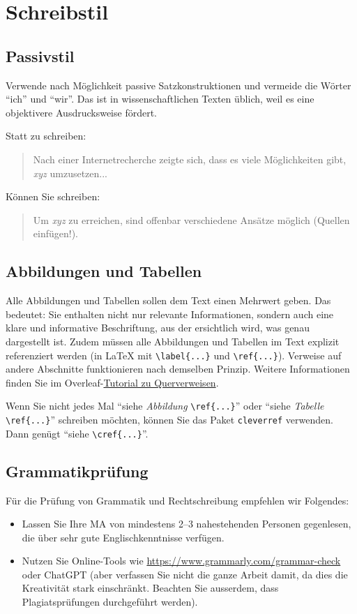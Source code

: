 \section{Schreibstil}
\subsection{Passivstil}
Verwende nach Möglichkeit passive Satzkonstruktionen und vermeide die Wörter \enquote{ich} und \enquote{wir}. Das ist in wissenschaftlichen Texten üblich, weil es eine objektivere Ausdrucksweise fördert.

\begin{tcolorbox}[title=Beispiel]
	Statt zu schreiben:
	\begin{quotation}
		Nach einer Internetrecherche zeigte sich, dass es viele Möglichkeiten gibt, \textit{xyz} umzusetzen...
	\end{quotation}
	Können Sie schreiben:
	\begin{quotation}
		Um \textit{xyz} zu erreichen, sind offenbar verschiedene Ansätze möglich (Quellen einfügen!).
	\end{quotation}
\end{tcolorbox}

\subsection{Abbildungen und Tabellen}
Alle Abbildungen und Tabellen sollen dem Text einen Mehrwert geben. Das bedeutet: Sie enthalten nicht nur relevante Informationen, sondern auch eine klare und informative Beschriftung, aus der ersichtlich wird, was genau dargestellt ist. Zudem müssen alle Abbildungen und Tabellen im Text explizit referenziert werden (in \LaTeX{} mit \lstinline|\label{...}| und \lstinline|\ref{...}|). Verweise auf andere Abschnitte funktionieren nach demselben Prinzip. Weitere Informationen finden Sie im Overleaf-\href{https://www.overleaf.com/learn/latex/Cross_referencing_sections%2C_equations_and_floats}{Tutorial zu Querverweisen}.

Wenn Sie nicht jedes Mal ``siehe \textit{Abbildung} \lstinline|\ref{...}|'' oder ``siehe \textit{Tabelle} \lstinline|\ref{...}|'' schreiben möchten, können Sie das Paket \texttt{cleverref} verwenden. Dann genügt ``siehe \lstinline|\cref{...}|''.

\subsection{Grammatikprüfung}
Für die Prüfung von Grammatik und Rechtschreibung empfehlen wir Folgendes:
\begin{itemize}
	\item Lassen Sie Ihre \gls{MA} von mindestens 2--3 nahestehenden Personen gegenlesen, die über sehr gute Englischkenntnisse verfügen.
	\item Nutzen Sie Online-Tools wie \url{https://www.grammarly.com/grammar-check} oder ChatGPT (aber verfassen Sie nicht die ganze Arbeit damit, da dies die Kreativität stark einschränkt. Beachten Sie ausserdem, dass Plagiatsprüfungen durchgeführt werden).
\end{itemize}

